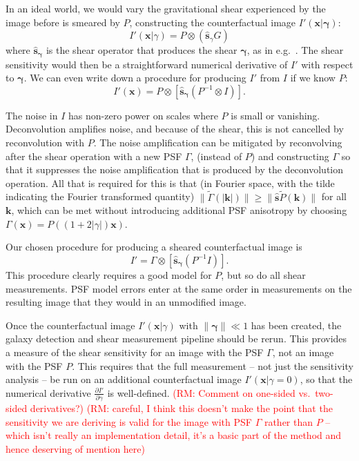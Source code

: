 \documentclass[iop]{emulateapj}
\newcommand\rmcomment[1]{\textcolor{red}{(RM: #1)}}
\begin{document}
In an ideal world, we would vary the gravitational shear experienced
by the image before is smeared by $P$, constructing the counterfactual
image $I'(\mathbf{x}| {\boldsymbol \gamma})$:
\begin{equation}
  I'({\mathbf{x}}|\gamma) = P \otimes\left( \hat{\mathbf{s}}_{\gamma}G\right)
\end{equation}
where $\hat{\mathbf{s}}_{\boldsymbol \gamma}$ is the shear operator
that produces the shear ${\boldsymbol \gamma}$, as in
e.g.~\cite{2002AJ....123..583B}. The shear sensitivity would then be a
straightforward numerical derivative of $I'$ with respect to
${\boldsymbol \gamma}$. We can even write down a procedure for
producing $I'$ from $I$ if we know $P$:
\begin{equation}
  I'({\mathbf{x}}) = P \otimes \left[\hat{\mathbf{s}}_{\boldsymbol \gamma}\left( P^{-1} \otimes I \right)\right].
\end{equation}

The noise in $I$ has non-zero power on scales where $P$ is small or
vanishing. Deconvolution amplifies noise, and because of the shear,
this is not cancelled by reconvolution with $P$.  The noise
amplification can be mitigated by reconvolving after the shear
operation with a new PSF $\Gamma$, (instead of $P$) and constructing
$\Gamma$ so that it suppresses the noise amplification that is
produced by the deconvolution operation. All that is required for this
is that (in Fourier space, with the tilde indicating the Fourier
transformed quantity)
$\|\tilde{\Gamma}(\mathbf{|k|}) \| \geq \|\hat{\mathbf{s}}
\tilde{P}(\mathbf{k})\|$
for all $\mathbf{k}$, which can be met without introducing additional
PSF anisotropy by choosing
$\Gamma(\mathbf{x}) = P\left((1+2|\gamma|)\mathbf{x}\right)$.

Our chosen procedure for producing a sheared counterfactual image is
\begin{equation}
I' = \Gamma \otimes \left[\hat{\mathbf{s}}_{\boldsymbol \gamma} \left(P^{-1} I \right)\right].
\end{equation}
This procedure clearly requires a good model for $P$, but so do all
shear measurements. PSF model errors enter at the
same order in measurements on the resulting image that they would in
an unmodified image.

Once the counterfactual image $I'(\mathbf{x}|\gamma)$ with
$\|{\boldsymbol \gamma}\| \ll 1$ has been created, the galaxy
detection and shear measurement pipeline should be rerun. This
provides a measure of the shear sensitivity for an image with the PSF
$\Gamma$, not an image with the PSF $P$. This requires that the full
measurement -- not just the sensitivity analysis -- be run on an
additional counterfactual image $I'(\mathbf{x}|\gamma=0)$, so that the
numerical derivative $\frac{\partial I'}{\partial \gamma}$ is
well-defined. \rmcomment{Comment on one-sided vs.\ two-sided
  derivatives?}  \rmcomment{careful, I think this doesn't make the
  point that the sensitivity we are deriving is valid for the image
  with PSF $\Gamma$ rather than $P$ -- which isn't really an
  implementation detail, it's a basic part of the method and hence
  deserving of mention here}
\end{document}
